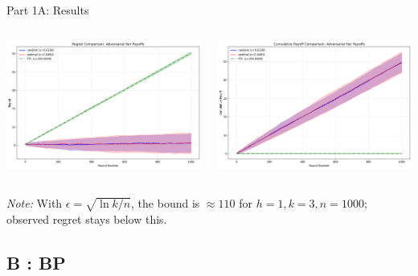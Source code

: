 \documentclass{beamer}
\begin{document}
\begin{frame}{Part 1A: Results}
\begin{columns}[T,onlytextwidth]
  \centering
  \includegraphics[width=\linewidth]{../figures/AFR_regret.png}

  \centering
  \includegraphics[width=\linewidth]{figures/AFR_payoff.png}
\end{columns}
\vspace{0.3em}
\small \textit{Note:} With $\epsilon=\sqrt{\ln k/n}$, the bound is $\approx 110$ for $h=1,k=3,n=1000$; observed regret stays below this.
\end{frame}

\subsection{B : BP}
\end{document}
